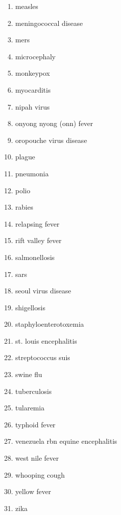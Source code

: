 \documentclass{article}
\begin{document}
\begin{multicols}{2}
\begin{enumerate}
    \item measles
    \item meningococcal disease
    \item mers
    \item microcephaly
    \item monkeypox
    \item myocarditis
    \item nipah virus
    \item onyong nyong (onn) fever
    \item oropouche virus disease
    \item plague
    \item pneumonia
    \item polio
    \item rabies
    \item relapsing fever
    \item rift valley fever
    \item salmonellosis
    \item sars
    \item seoul virus disease
    \item shigellosis
    \item staphyloenterotoxemia
    \item st. louis encephalitis
    \item streptococcus suis
    \item swine flu
    \item tuberculosis
    \item tularemia
    \item typhoid fever
    \item venezuela rbn equine encephalitis
    \item west nile fever
    \item whooping cough
    \item yellow fever
    \item zika
  \end{enumerate}
\end{multicols}
\end{document}
